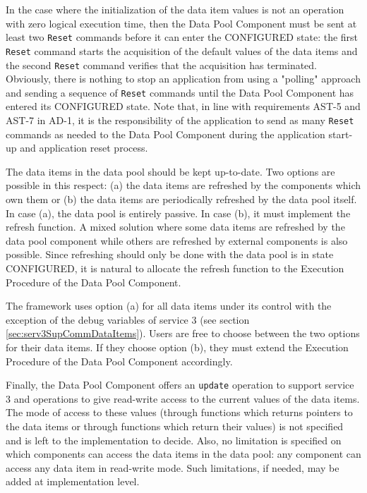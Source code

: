 \documentclass[a4paper,10pt]{article}
\begin{document}
In the case where the initialization of the data item values is not an operation with zero logical execution time, then the Data Pool Component must be sent at least two \texttt{Reset} commands before it can enter the CONFIGURED state: the first \texttt{Reset} command starts the acquisition of the default values of the data items and the second \texttt{Reset} command verifies that the acquisition has terminated. Obviously, there is nothing to stop an application from using a "polling" approach and sending a sequence of \texttt{Reset} commands until the Data Pool Component has entered its CONFIGURED state. Note that, in line with requirements AST-5 and AST-7 in AD-1, it is the responsibility of the application to send as many \texttt{Reset} commands as needed to the Data Pool Component during the application start-up and application reset process.

The data items in the data pool should be kept up-to-date. Two options are possible in this respect: (a) the data items are refreshed by the components which own them or (b) the data items are periodically refreshed by the data pool itself. In case (a), the data pool is entirely passive. In case (b), it must implement the refresh function. A mixed solution where some data items are refreshed by the data pool component while others are refreshed by external components is also possible. Since refreshing should only be done with the data pool is in state CONFIGURED, it is natural to allocate the refresh function to the Execution Procedure of the Data Pool Component. 

The framework uses option (a) for all data items under its control with the exception of the debug variables of service 3 (see section \ref{sec:serv3SupCommDataItems}). Users are free to choose between the two options for their data items. If they choose option (b), they must extend the Execution Procedure of the Data Pool Component accordingly.

Finally, the Data Pool Component offers an \texttt{update} operation to support service 3 and operations to give read-write access to the current values of the data items. The mode of access to these values (through functions which returns pointers to the data items or through functions which return their values) is not specified and is left to the implementation to decide. Also, no limitation is specified on which components can access the data items in the data pool: any component can access any data item in read-write mode. Such limitations, if needed, may be added at implementation level. 
\end{document}
